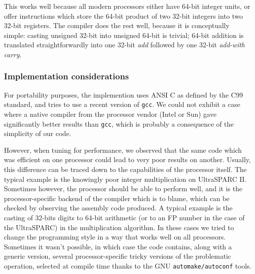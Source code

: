 This works well because all modern processors either have 64-bit
integer units, or offer instructions which store the 64-bit product of
two 32-bit integers into two 32-bit registers. The compiler does the
rest well, because it is conceptually simple: casting unsigned 32-bit
into unsigned 64-bit is trivial; 64-bit addition is translated
straightforwardly into one 32-bit \emph{add} followed by one 32-bit
\emph{add-with carry}.




\subsubsection{Implementation considerations}

For portability purposes, the implemention uses ANSI C as defined by
the C99 standard, and tries to use a recent version of \texttt{gcc}.
We could not exhibit a case where a native compiler from the processor
vendor (Intel or Sun) gave significantly better results than
\texttt{gcc}, which is probably a consequence of the simplicity of our
code.

However, when tuning for performance, we observed that the same code
which was efficient on one processor could lead to very poor results
on another.  Usually, this difference can be traced down to the
capabilities of the processor itself. The typical example is the
knowingly poor integer multiplication on UltraSPARC II. Sometimes
however, the processor should be able to perform well, and it is the
processor-specific backend of the compiler which is to blame, which
can be checked by observing the assembly code produced.  A typical
example is the casting of 32-bits digits to 64-bit arithmetic (or to
an FP number in the case of the UltraSPARC) in the multiplication
algorithm. In these cases we tried to change the programming style in
a way that works well on all processors. Sometimes it wasn't possible,
in which case the code contains, along with a generic version, several
processor-specific tricky versions of the problematic operation,
selected at compile time thanks to the GNU \texttt{automake/autoconf}
tools.



